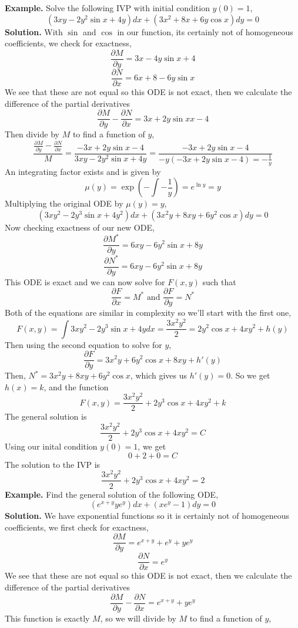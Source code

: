 \documentclass[openany]{report}
\begin{document}
\textbf{Example.} Solve the following IVP with initial condition $y(0) = 1$,
\[(3xy - 2y^2\sin x + 4y)dx + (3x^2 + 8x + 6y \cos x)dy = 0\]
\textbf{Solution.} With $\sin$ and $\cos$ in our function, its certainly not of homogeneous coefficients, we check for exactness, 
\[\frac{\partial M}{\partial y} = 3x - 4y \sin x + 4\]
\[\frac{\partial N}{\partial x} = 6x + 8 - 6y \sin x\]
We see that these are not equal so this ODE is not exact, then we calculate the difference of the partial derivatives 
\[\frac{\partial M}{\partial y} - \frac{\partial N}{\partial x} = 3x + 2y\sin x x  -4\]
Then divide by $M$ to find a function of $y$, 
\[\frac{\frac{\partial M}{\partial y} - \frac{\partial N}{\partial x}}{M} = \frac{-3x + 2y\sin x - 4}{3xy - 2y^2\sin x + 4y} = \frac{-3x + 2y\sin x-4}{-y(-3x+2y\sin x - 4) = -\frac{1}{y}}\]
An integrating factor exists and is given by
\[\mu(y) = \exp\left(-\int -\frac{1}{y}\right) = e^{\ln y} = y\]
Multiplying the original ODE by $\mu(y) = y$,
\[(3xy^2 - 2y^3\sin x + 4y^2)dx + (3x^2y + 8xy + 6y^2\cos x)dy = 0 \]
Now checking exactness of our new ODE, 
\[\frac{\partial M^*}{\partial y} = 6xy - 6y^2 \sin x + 8y\]
\[\frac{\partial N^*}{\partial y} = 6xy - 6y^2 \sin x + 8y\]
This ODE is exact and we can now solve for $F(x,y)$ such that
\[\frac{\partial F}{\partial x} = M^* \text{ and } \frac{\partial F}{\partial y} = N^*\]
Both of the equations are similar in complexity so we'll start with the first one,
\[F(x,y) = \int 3xy^2 - 2y^3 \sin x + 4y dx = \frac{3x^2y^2}{2} = 2y^2\cos x + 4xy^2 + h(y)\]
Then using the second equation to solve for $y$, 
\[\frac{\partial F}{\partial y} = 3x^2y + 6y^2\cos x + 8xy + h'(y)\]
Then, $N^* = 3x^2y + 8xy + 6y^2\cos x$, which gives us $h'(y) = 0$. So we get $h(x) = k$, and the function
\[F(x,y) = \frac{3x^2y^2}{2} + 2y^3 \cos x + 4xy^2 + k\]
The general solution is 
\[\frac{3x^2y^2}{2} + 2y^3 \cos x + 4xy^2 = C\]
Using our inital condition $y(0) = 1$, we get
\[0 + 2 + 0 = C\]
The solution to the IVP is 
\[\frac{3x^2y^2}{2} + 2y^3 \cos x + 4xy^2 = 2\]
\textbf{Example.} Find the general solution of the following ODE,
\[(e^{x+y} ye^y)dx + (xe^y - 1)dy = 0\]
\textbf{Solution.} We have exponential functions so it is certainly not of homogeneous coefficients, we first check for exactness,
\[\frac{\partial M}{\partial y} = e^{x+y} + e^y + ye^y\]
\[\frac{\partial N}{\partial x} = e^y\]
We see that these are not equal so this ODE is not exact, then we calculate the difference of the partial derivatives
\[\frac{\partial M}{\partial y} - \frac{\partial N}{\partial x} = e^{x+y} + ye^y\]
This function is exactly $M$, so we will divide by $M$ to find a function of $y$,
\end{document}
